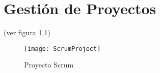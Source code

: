 \chapter{Gestión de Proyectos}

(ver figura \ref{fig:ScrumProject})

\begin{figure}[h]
  \centering
  \texttt{[image: ScrumProject]}
  \caption{Proyecto Scrum}
  \centering
  \label{fig:ScrumProject} %
\end{figure}
